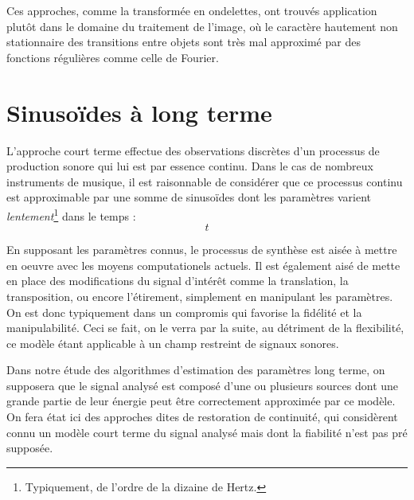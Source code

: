 Ces approches, comme la transformée en ondelettes, ont trouvés application plutôt dans le domaine du traitement de l'image, où le caractère hautement non stationnaire des transitions entre objets sont très mal approximé par des fonctions régulières comme celle de Fourier.

\section{ \nmu Sinusoïdes à long terme}  \label{sec:slt}

\cite{mcaulay}

L'approche court terme effectue des observations discrètes d'un processus de production sonore qui lui est par essence continu. Dans le cas de nombreux instruments de musique, il est raisonnable de considérer que ce processus continu est approximable par une somme de sinusoïdes dont les paramètres varient \textsl{lentement}\footnote{Typiquement, de l'ordre de la dizaine de Hertz.} dans le temps :
\begin{equation}
t
\end{equation}

En supposant les paramètres connus, le processus de synthèse est aisée à mettre en oeuvre avec les moyens computationels actuels. Il est également aisé de mette en place des modifications du signal d'intérêt comme la translation, la transposition, ou encore l'étirement, simplement en manipulant les paramètres. On est donc typiquement dans un compromis qui favorise la fidélité et la manipulabilité. Ceci se fait, on le verra par la suite, au détriment de la flexibilité, ce modèle étant applicable à un champ restreint de signaux sonores.

Dans notre étude des algorithmes d'estimation des paramètres long terme, on supposera que le signal analysé est composé d'une ou plusieurs sources dont une grande partie de leur énergie peut être correctement approximée par ce modèle. On fera état ici des approches dites de \og restoration \fg de continuité, qui considèrent connu un modèle court terme du signal analysé mais dont la fiabilité n'est pas pré supposée.


